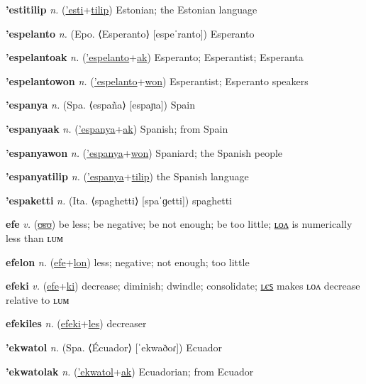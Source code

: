 \textbf{\hypertarget{'estitilip}{'estitilip}} \textit{n.} (\hyperlink{'esti}{'esti}+\allowbreak \hyperlink{tilip}{tilip})
Estonian; the Estonian language

\textbf{\hypertarget{'espelanto}{'espelanto}} \textit{n.} (Epo. ⟨Esperanto⟩ [espeˈranto])
Esperanto

\textbf{\hypertarget{'espelantoak}{'espelantoak}} \textit{n.} (\hyperlink{'espelanto}{'espelanto}+\allowbreak \hyperlink{ak}{ak})
Esperanto; Esperantist; Esperanta

\textbf{\hypertarget{'espelantowon}{'espelantowon}} \textit{n.} (\hyperlink{'espelanto}{'espelanto}+\allowbreak \hyperlink{won}{won})
Esperantist; Esperanto speakers

\textbf{\hypertarget{'espanya}{'espanya}} \textit{n.} (Spa. ⟨españa⟩ [espaɲa])
Spain

\textbf{\hypertarget{'espanyaak}{'espanyaak}} \textit{n.} (\hyperlink{'espanya}{'espanya}+\allowbreak \hyperlink{ak}{ak})
Spanish; from Spain

\textbf{\hypertarget{'espanyawon}{'espanyawon}} \textit{n.} (\hyperlink{'espanya}{'espanya}+\allowbreak \hyperlink{won}{won})
Spaniard; the Spanish people

\textbf{\hypertarget{'espanyatilip}{'espanyatilip}} \textit{n.} (\hyperlink{'espanya}{'espanya}+\allowbreak \hyperlink{tilip}{tilip})
the Spanish language

\textbf{\hypertarget{'espaketti}{'espaketti}} \textit{n.} (Ita. ⟨spaghetti⟩ [spaˈɡetti])
spaghetti

\textbf{\hypertarget{efe}{efe}} \textit{v.} (\hyperlink{oso}{\sout{oso}})
be less; be negative; be not enough; be too little; \hyperlink{efelon}{ʟᴏᴧ} is numerically less than ʟᴜᴍ

\textbf{\hypertarget{efelon}{efelon}} \textit{n.} (\hyperlink{efe}{efe}+\allowbreak \hyperlink{lon}{lon})
less; negative; not enough; too little

\textbf{\hypertarget{efeki}{efeki}} \textit{v.} (\hyperlink{efe}{efe}+\allowbreak \hyperlink{ki}{ki})
decrease; diminish; dwindle; consolidate; \hyperlink{efekiles}{ʟєꜱ} makes ʟᴏᴧ decrease relative to ʟᴜᴍ

\textbf{\hypertarget{efekiles}{efekiles}} \textit{n.} (\hyperlink{efeki}{efeki}+\allowbreak \hyperlink{les}{les})
decreaser

\textbf{\hypertarget{'ekwatol}{'ekwatol}} \textit{n.} (Spa. ⟨Écuador⟩ [ˈekwaðoɾ])
Ecuador

\textbf{\hypertarget{'ekwatolak}{'ekwatolak}} \textit{n.} (\hyperlink{'ekwatol}{'ekwatol}+\allowbreak \hyperlink{ak}{ak})
Ecuadorian; from Ecuador

